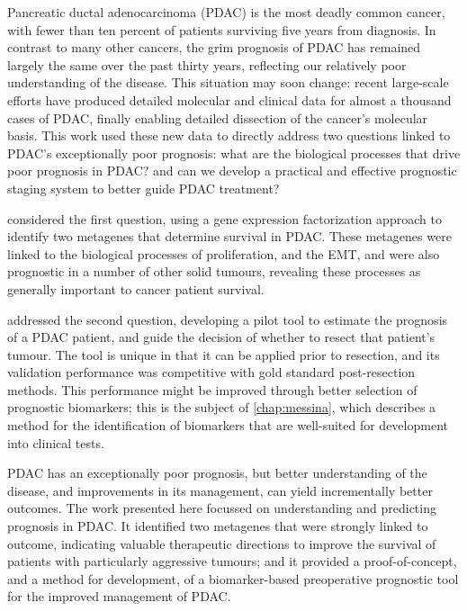 Pancreatic ductal adenocarcinoma (PDAC) is the most deadly common cancer, with fewer than ten percent of patients surviving five years from diagnosis.  In contrast to many other cancers, the grim prognosis of PDAC has remained largely the same over the past thirty years, reflecting our relatively poor understanding of the disease.  This situation may soon change: recent large-scale efforts have produced detailed molecular and clinical data for almost a thousand cases of PDAC, finally enabling detailed dissection of the cancer's molecular basis.  This work used these new data to directly address two questions linked to PDAC's exceptionally poor prognosis: what are the biological processes that drive poor prognosis in PDAC? and can we develop a practical and effective prognostic staging system to better guide PDAC treatment?
\par
{} considered the first question, using a gene expression factorization approach to identify two metagenes that determine survival in PDAC.  These metagenes were linked to the biological processes of proliferation, and the EMT, and were also prognostic in a number of other solid tumours, revealing these processes as generally important to cancer patient survival.  
\par
{} addressed the second question, developing a pilot tool to estimate the prognosis of a PDAC patient, and guide the decision of whether to resect that patient's tumour.  The tool is unique in that it can be applied prior to resection, and its validation performance was competitive with gold standard post-resection methods.  This performance might be improved through better selection of prognostic biomarkers; this is the subject of \cref{chap:messina}, which describes a method for the identification of biomarkers that are well-suited for development into clinical tests.
\par
PDAC has an exceptionally poor prognosis, but better understanding of the disease, and improvements in its management, can yield incrementally better outcomes.  The work presented here focussed on understanding and predicting prognosis in PDAC.  It identified two metagenes that were strongly linked to outcome, indicating valuable therapeutic directions to improve the survival of patients with particularly aggressive tumours; and it provided a proof-of-concept, and a method for development, of a biomarker-based preoperative prognostic tool for the improved management of PDAC.
